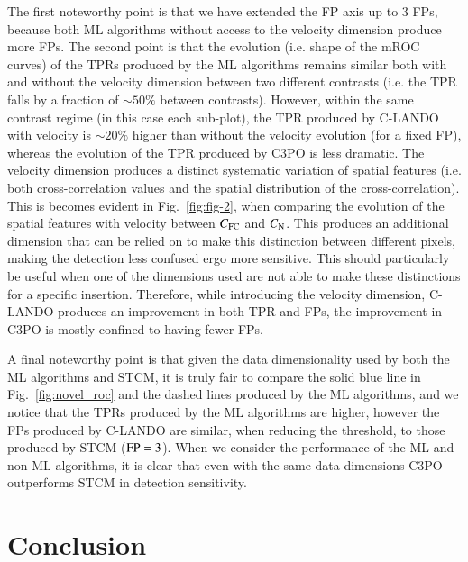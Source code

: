 \documentclass{aa}
\begin{document}
The first noteworthy point is that we have extended the FP axis up to $3$ FPs, because both ML algorithms without access to the velocity dimension produce more FPs.
The second point is that the evolution (i.e. shape of the mROC curves) of the TPRs produced by the ML algorithms remains similar both with and without the velocity dimension between two different contrasts (i.e. the TPR falls by a fraction of $\sim 50\%$ between contrasts).
However, within the same contrast regime (in this case each sub-plot), the TPR produced by C-LANDO with velocity is $\sim 20\%$ higher than without the velocity evolution (for a fixed FP), whereas the evolution of the TPR produced by C3PO is less dramatic.
The velocity dimension produces a distinct systematic variation of spatial features (i.e. both cross-correlation values and the spatial distribution of the cross-correlation).
This is becomes evident in Fig.~\ref{fig:fig-2}, when comparing the evolution of the spatial features with velocity between $C_{\rm FC}$ and $C_{\rm N}$.
This produces an additional dimension that can be relied on to make this distinction between different pixels, making the detection less confused ergo more sensitive.
This should particularly be useful when one of the dimensions used are not able to make these distinctions for a specific insertion.
Therefore, while introducing the velocity dimension, C-LANDO produces an improvement in both TPR and FPs, the improvement in C3PO is mostly confined to having fewer FPs.

A final noteworthy point is that given the data dimensionality used by both the ML algorithms and STCM, it is truly fair to compare the solid blue line in Fig.~\ref{fig:novel_roc} and the dashed lines produced by the ML algorithms, and we notice that the TPRs produced by the ML algorithms are higher, however the FPs produced by C-LANDO are similar, when reducing the threshold, to those produced by STCM (${\rm FP}=3$). 
When we consider the performance of the ML and non-ML algorithms, it is clear that even with the same data dimensions C3PO outperforms STCM in detection sensitivity.
\section{Conclusion}
\end{document}
